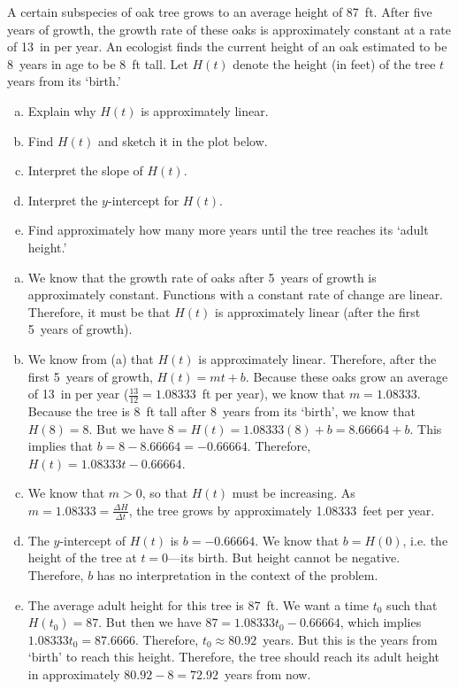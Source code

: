 \documentclass[11pt,letterpaper]{article}
\begin{document}

 A certain subspecies of oak tree grows to an average height of 87~ft. After five years of growth, the growth rate of these oaks is approximately constant at a rate of 13~in per year. An ecologist finds the current height of an oak estimated to be 8~years in age to be 8~ft tall. Let $H(t)$ denote the height (in feet) of the tree $t$ years from its `birth.' 
	\begin{enumerate}[(a)]
	\item Explain why $H(t)$ is approximately linear. 
	\item Find $H(t)$ and sketch it in the plot below. 
	\item Interpret the slope of $H(t)$.
	\item Interpret the $y$-intercept for $H(t)$.
	\item Find approximately how many more years until the tree reaches its `adult height.' 
	\end{enumerate} 

\sol 
\begin{enumerate}[(a)]
\item We know that the growth rate of oaks after 5~years of growth is approximately constant. Functions with a constant rate of change are linear. Therefore, it must be that $H(t)$ is approximately linear (after the first 5~years of growth). 

\item We know from (a) that $H(t)$ is approximately linear. Therefore, after the first 5~years of growth, $H(t)= mt + b$. Because these oaks grow an average of 13~in per year ($\frac{13}{12}= 1.08333$~ft per year), we know that $m= 1.08333$. Because the tree is 8~ft tall after 8~years from its `birth', we know that $H(8)= 8$. But we have $8= H(t)= 1.08333(8) + b= 8.66664 + b$. This implies that $b= 8 - 8.66664= -0.66664$. Therefore, $H(t)= 1.08333t - 0.66664$. 

\item We know that $m > 0$, so that $H(t)$ must be increasing. As $m= 1.08333= \frac{\Delta H}{\Delta t}$, the tree grows by approximately 1.08333~feet per year. 

\item The $y$-intercept of $H(t)$ is $b= -0.66664$. We know that $b= H(0)$, i.e. the height of the tree at $t= 0$---its birth. But height cannot be negative. Therefore, $b$ has no interpretation in the context of the problem. 

\item The average adult height for this tree is 87~ft. We want a time $t_0$ such that $H(t_0)= 87$. But then we have $87= 1.08333t_0 - 0.66664$, which implies $1.08333t_0= 87.6666$. Therefore, $t_0\approx 80.92$~years. But this is the years from `birth' to reach this height. Therefore, the tree should reach its adult height in approximately $80.92 - 8= 72.92$~years from now. 
\end{enumerate}
	
\end{document}

